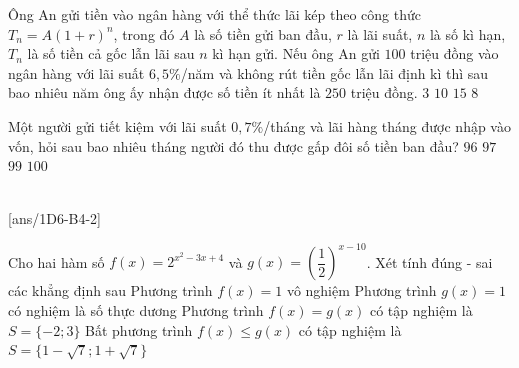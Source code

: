 \begin{ex}%
	Ông An gửi tiền vào ngân hàng với  thể thức lãi kép theo công thức $T_n=A(1+r)^n$, trong đó $A$ là số tiền gửi ban đầu, $r$ là lãi suất, $n$ là số kì hạn, $T_n$ là số tiền cả gốc lẫn lãi sau $n$ kì hạn gửi. Nếu ông An gửi $100$ triệu đồng vào ngân hàng với lãi suất $6{,}5\%$/năm và không rút tiền gốc lẫn lãi định kì thì sau bao nhiêu năm ông ấy nhận được số tiền ít nhất là $250$ triệu đồng.
	\choice
	{$3$}
	{$10$}
	{\True $15$}
	{$8$}
\end{ex}

\begin{ex}%
	Một người gửi tiết kiệm với lãi suất $0{,}7\%$/tháng và lãi hàng tháng được nhập vào vốn, hỏi sau bao nhiêu tháng người đó thu được gấp đôi số tiền ban đầu?
	\choice
	{$96$}
	{$97$}
	{$99$}
	{\True $100$}
\end{ex}


 \\
[ans/1D6-B4-2]

\begin{ex}
	Cho hai hàm số $f(x)=2^{x^2-3x+4}$ và $g(x)=\left(\dfrac{1}{2}\right)^{x-10}$. Xét tính đúng - sai các khẳng định sau
	\choiceTF
	{\True Phương trình $f(x)=1$ vô nghiệm}
	{\True Phương trình $g(x)=1$ có nghiệm là số thực dương}
	{Phương trình $f(x)=g(x)$ có tập nghiệm là $S=\{-2;3\}$}
	{Bất phương trình $f(x)\leq g(x)$ có tập nghiệm là $S=\{1-\sqrt{7};1+\sqrt{7}\}$}
	\loigiai{
	}
\end{ex}

